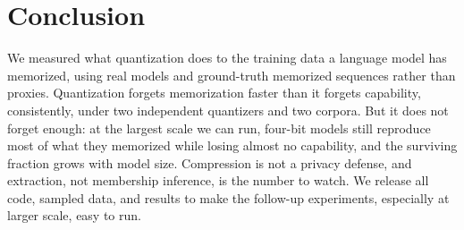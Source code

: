 \documentclass{article}
\begin{document}
\section{Conclusion}

We measured what quantization does to the training data a language model has
memorized, using real models and ground-truth memorized sequences rather than
proxies. Quantization forgets memorization faster than it forgets capability,
consistently, under two independent quantizers and two corpora. But it does
not forget enough: at the largest scale we can run, four-bit models still
reproduce most of what they memorized while losing almost no capability, and
the surviving fraction grows with model size. Compression is not a privacy
defense, and extraction, not membership inference, is the number to watch. We
release all code, sampled data, and results to make the follow-up
experiments, especially at larger scale, easy to run.
\end{document}
